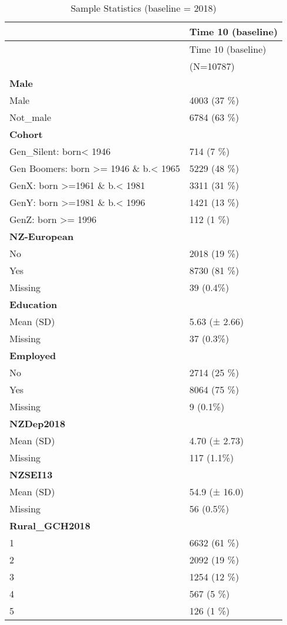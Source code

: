 \documentclass[
  singlecolumn]{report}
\begin{document}
\hypertarget{tbl-sample}{}
\begin{longtable}[]{@{}ll@{}}
\caption{\label{tbl-sample}Sample Statistics (baseline =
2018)}\tabularnewline
\toprule()
& Time 10 (baseline) \\
\midrule()
\endfirsthead
\toprule()
& Time 10 (baseline) \\
\midrule()
\endhead
& (N=10787) \\
\textbf{Male} & \\
Male & 4003 (37 \%) \\
Not\_male & 6784 (63 \%) \\
\textbf{Cohort} & \\
Gen\_Silent: born\textless{} 1946 & 714 (7 \%) \\
Gen Boomers: born \textgreater= 1946 \& b.\textless{} 1965 & 5229 (48
\%) \\
GenX: born \textgreater=1961 \& b.\textless{} 1981 & 3311 (31 \%) \\
GenY: born \textgreater=1981 \& b.\textless{} 1996 & 1421 (13 \%) \\
GenZ: born \textgreater= 1996 & 112 (1 \%) \\
\textbf{NZ-European} & \\
No & 2018 (19 \%) \\
Yes & 8730 (81 \%) \\
Missing & 39 (0.4\%) \\
\textbf{Education} & \\
Mean (SD) & 5.63 (± 2.66) \\
Missing & 37 (0.3\%) \\
\textbf{Employed} & \\
No & 2714 (25 \%) \\
Yes & 8064 (75 \%) \\
Missing & 9 (0.1\%) \\
\textbf{NZDep2018} & \\
Mean (SD) & 4.70 (± 2.73) \\
Missing & 117 (1.1\%) \\
\textbf{NZSEI13} & \\
Mean (SD) & 54.9 (± 16.0) \\
Missing & 56 (0.5\%) \\
\textbf{Rural\_GCH2018} & \\
1 & 6632 (61 \%) \\
2 & 2092 (19 \%) \\
3 & 1254 (12 \%) \\
4 & 567 (5 \%) \\
5 & 126 (1 \%) \\

\end{longtable}
\end{document}

